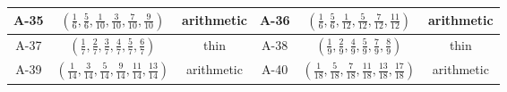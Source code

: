 \documentclass[11pt,a4paper]{amsart}
\theoremstyle{definition}
\theoremstyle{definition}
\numberwithin{equation}{section}
\begin{document}
{\begin{longtable}{|c|c|c|||c|c|c|}
\hline
A-35 & $\left(\frac{1}{6},\frac{5}{6},\frac{1}{10},\frac{3}{10},\frac{7}{10},\frac{9}{10}\right)$ & arithmetic \cite{bdss} &
A-36 & $\left(\frac{1}{6},\frac{5}{6},\frac{1}{12},\frac{5}{12},\frac{7}{12},\frac{11}{12}\right)$ & arithmetic \cite{bdss} \\
\hline
A-37 & $\left(\frac{1}{7},\frac{2}{7},\frac{3}{7},\frac{4}{7},\frac{5}{7},\frac{6}{7}\right)$ & thin &
A-38 & $\left(\frac{1}{9},\frac{2}{9},\frac{4}{9},\frac{5}{9},\frac{7}{9},\frac{8}{9}\right)$ & thin \\
\hline
A-39 & $\left(\frac{1}{14},\frac{3}{14},\frac{5}{14},\frac{9}{14},\frac{11}{14},\frac{13}{14}\right)$ & arithmetic \cite{BDN22} &
A-40 & $\left(\frac{1}{18},\frac{5}{18},\frac{7}{18},\frac{11}{18},\frac{13}{18},\frac{17}{18}\right)$ & arithmetic \cite{bdss} \\
\hline
\end{longtable}}
\end{document}
